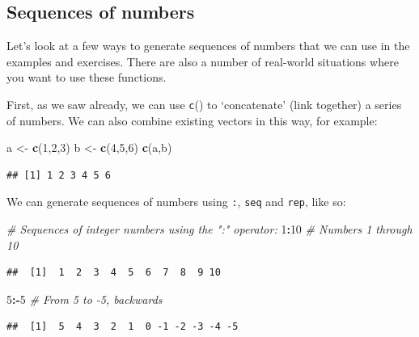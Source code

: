 \documentclass[]{book}
\newenvironment{Shaded}{\begin{snugshade}}{\end{snugshade}}
\newcommand{\CommentTok}[1]{\textcolor[rgb]{0.56,0.35,0.01}{\textit{#1}}}
\newcommand{\DecValTok}[1]{\textcolor[rgb]{0.00,0.00,0.81}{#1}}
\newcommand{\KeywordTok}[1]{\textcolor[rgb]{0.13,0.29,0.53}{\textbf{#1}}}
\newcommand{\NormalTok}[1]{#1}
\newcommand{\OperatorTok}[1]{\textcolor[rgb]{0.81,0.36,0.00}{\textbf{#1}}}
\newcommand{\StringTok}[1]{\textcolor[rgb]{0.31,0.60,0.02}{#1}}
\begin{document}
\hypertarget{sequences}{%
\subsection{Sequences of numbers}\label{sequences}}

Let's look at a few ways to generate sequences of numbers that we can use in the examples and exercises. There are also a number of real-world situations where you want to use these functions.

First, as we saw already, we can use \texttt{c}() to `concatenate' (link together) a series of numbers. We can also combine existing vectors in this way, for example:

\begin{Shaded}
\begin{Highlighting}[]
\NormalTok{a <-}\StringTok{ }\KeywordTok{c}\NormalTok{(}\DecValTok{1}\NormalTok{,}\DecValTok{2}\NormalTok{,}\DecValTok{3}\NormalTok{)}
\NormalTok{b <-}\StringTok{ }\KeywordTok{c}\NormalTok{(}\DecValTok{4}\NormalTok{,}\DecValTok{5}\NormalTok{,}\DecValTok{6}\NormalTok{)}
\KeywordTok{c}\NormalTok{(a,b)}
\end{Highlighting}
\end{Shaded}

\begin{verbatim}
## [1] 1 2 3 4 5 6
\end{verbatim}

We can generate sequences of numbers using \texttt{:}, \texttt{seq} and \texttt{rep}, like so:

\begin{Shaded}
\begin{Highlighting}[]
\CommentTok{# Sequences of integer numbers using the ":" operator:}
\DecValTok{1}\OperatorTok{:}\DecValTok{10}   \CommentTok{# Numbers 1 through 10}
\end{Highlighting}
\end{Shaded}

\begin{verbatim}
##  [1]  1  2  3  4  5  6  7  8  9 10
\end{verbatim}

\begin{Shaded}
\begin{Highlighting}[]
\DecValTok{5}\OperatorTok{:-}\DecValTok{5}   \CommentTok{# From 5 to -5, backwards}
\end{Highlighting}
\end{Shaded}

\begin{verbatim}
##  [1]  5  4  3  2  1  0 -1 -2 -3 -4 -5
\end{verbatim}
\end{document}
